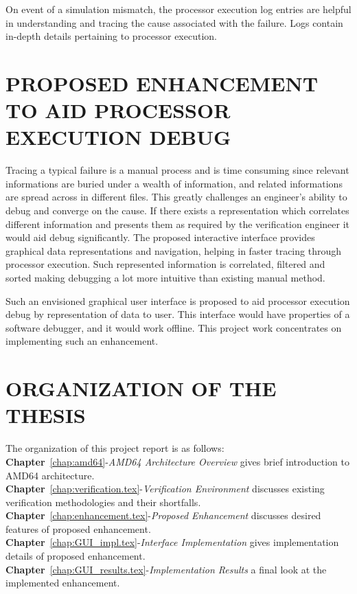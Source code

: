 On event of a simulation mismatch, the processor execution log entries are helpful in understanding and tracing the cause associated with the failure. Logs contain in-depth details pertaining to processor execution. 

\section{PROPOSED ENHANCEMENT TO AID PROCESSOR EXECUTION DEBUG}
Tracing a typical failure is a manual process and is time consuming since relevant informations are buried under a wealth of information, and related informations are spread across in different files. This greatly challenges an engineer's ability to debug and converge on the cause. If there exists a representation which correlates different information and presents them as required by the verification engineer it would aid debug significantly. The proposed interactive interface provides graphical data representations and navigation, helping in faster tracing through processor execution. Such represented information is correlated, filtered and sorted making debugging a lot more intuitive than existing manual method.


Such an envisioned graphical user interface is proposed to aid processor execution debug by representation of data to user. This interface would have properties of a software debugger, and it would work offline. This project work concentrates on implementing such an enhancement.

 


\section{ORGANIZATION OF THE THESIS}
The organization of this project report is as follows:\\
\noindent 
{\bf Chapter}~\ref{chap:amd64}-{\it AMD64 Architecture Overview} gives brief introduction to AMD64 architecture.\\
{\bf Chapter}~\ref{chap:verification.tex}-{\it Verification Environment} discusses existing verification methodologies and their shortfalls.\\
{\bf Chapter}~\ref{chap:enhancement.tex}-{\it Proposed Enhancement} discusses desired features of proposed enhancement.\\
{\bf Chapter}~\ref{chap:GUI_impl.tex}-{\it Interface Implementation} gives implementation details of proposed enhancement.\\
{\bf Chapter}~\ref{chap:GUI_results.tex}-{\it Implementation Results} a final look at the implemented enhancement.\\

